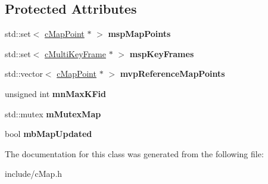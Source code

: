 \subsection*{Protected Attributes}
\begin{DoxyCompactItemize}
\item 
std\+::set$<$ \hyperlink{classMultiColSLAM_1_1cMapPoint}{c\+Map\+Point} $\ast$ $>$ {\bfseries msp\+Map\+Points}\hypertarget{classMultiColSLAM_1_1cMap_a75bbbc0d281fdb7a41a513cef84831d8}{}\label{classMultiColSLAM_1_1cMap_a75bbbc0d281fdb7a41a513cef84831d8}

\item 
std\+::set$<$ \hyperlink{classMultiColSLAM_1_1cMultiKeyFrame}{c\+Multi\+Key\+Frame} $\ast$ $>$ {\bfseries msp\+Key\+Frames}\hypertarget{classMultiColSLAM_1_1cMap_a93606334a8888795659cb65019090de2}{}\label{classMultiColSLAM_1_1cMap_a93606334a8888795659cb65019090de2}

\item 
std\+::vector$<$ \hyperlink{classMultiColSLAM_1_1cMapPoint}{c\+Map\+Point} $\ast$ $>$ {\bfseries mvp\+Reference\+Map\+Points}\hypertarget{classMultiColSLAM_1_1cMap_a30df225c0cf201cc4dc145b2cd3f353e}{}\label{classMultiColSLAM_1_1cMap_a30df225c0cf201cc4dc145b2cd3f353e}

\item 
unsigned int {\bfseries mn\+Max\+K\+Fid}\hypertarget{classMultiColSLAM_1_1cMap_a7d1366b988b6d71be613c8b5839afca0}{}\label{classMultiColSLAM_1_1cMap_a7d1366b988b6d71be613c8b5839afca0}

\item 
std\+::mutex {\bfseries m\+Mutex\+Map}\hypertarget{classMultiColSLAM_1_1cMap_ad8a88057b75a349163599a5f97e27343}{}\label{classMultiColSLAM_1_1cMap_ad8a88057b75a349163599a5f97e27343}

\item 
bool {\bfseries mb\+Map\+Updated}\hypertarget{classMultiColSLAM_1_1cMap_a06e0fff4858a9ab51bb6260205ecfa72}{}\label{classMultiColSLAM_1_1cMap_a06e0fff4858a9ab51bb6260205ecfa72}

\end{DoxyCompactItemize}


The documentation for this class was generated from the following file\+:\begin{DoxyCompactItemize}
\item 
include/c\+Map.\+h\end{DoxyCompactItemize}

